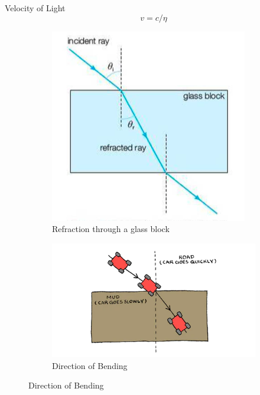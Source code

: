 \documentclass{beamer}
\begin{document}
\begin{frame}
	\begin{block}{Velocity of Light}
		\begin{displaymath}
			v = c/\eta
		\end{displaymath}
	\end{block}
	\begin{figure}
		\centering
		\begin{subfigure}[b]{0.42\textwidth}
			\centering
			\includegraphics[width=\textwidth]{25.png}
			\caption{Refraction through a glass block}
			\label{Refraction}
		\end{subfigure}
		\hfill
		\begin{subfigure}[b]{0.5\textwidth}
			\centering
			\includegraphics[width=\textwidth]{26.png}
			\caption{Direction of Bending}
			\label{Bending Direction}
		\end{subfigure}
	\end{figure}
\end{frame}
\end{document}

